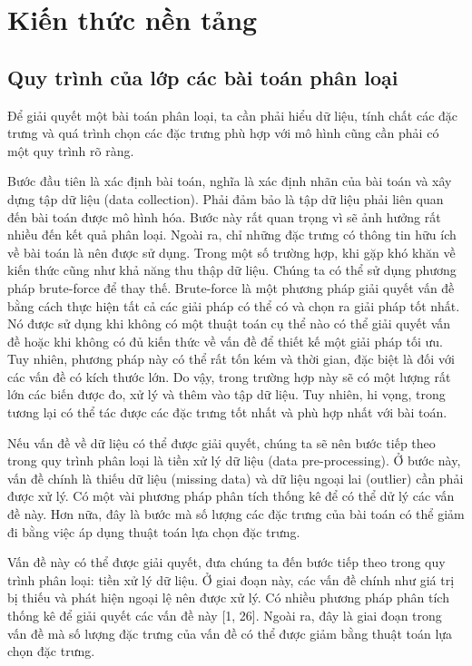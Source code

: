 \chapter{Kiến thức nền tảng}

\section{Quy trình của lớp các bài toán phân loại}
Để giải quyết một bài toán phân loại, ta cần phải hiểu dữ liệu, tính chất các đặc trưng và quá trình chọn các đặc trưng phù hợp với mô hình cũng cần phải có một quy trình rõ ràng.

Bước đầu tiên là xác định bài toán, nghĩa là xác định nhãn của bài toán và xây dựng tập dữ liệu (data collection). Phải đảm bảo là tập dữ liệu phải liên quan đến bài toán được mô hình hóa. Bước này rất quan trọng vì sẽ ảnh hưởng rất nhiều đến kết quả phân loại. Ngoài ra, chỉ những đặc trưng có thông tin hữu ích về bài toán là nên được sử dụng. Trong một số trường hợp, khi gặp khó khăn về kiến thức cũng như khả năng thu thập dữ liệu. Chúng ta có thể sử dụng phương pháp brute-force để thay thế. Brute-force là một phương pháp giải quyết vấn đề bằng cách thực hiện tất cả các giải pháp có thể có và chọn ra giải pháp tốt nhất. Nó được sử dụng khi không có một thuật toán cụ thể nào có thể giải quyết vấn đề hoặc khi không có đủ kiến thức về vấn đề để thiết kế một giải pháp tối ưu. Tuy nhiên, phương pháp này có thể rất tốn kém và thời gian, đặc biệt là đối với các vấn đề có kích thước lớn. Do vậy, trong trường hợp này sẽ có một lượng rất lớn các biến được đo, xử lý và thêm vào tập dữ liệu. Tuy nhiên, hi vọng, trong tương lại có thể tác được các đặc trưng tốt nhất và phù hợp nhất với bài toán.

Nếu vấn đề về dữ liệu có thể được giải quyết, chúng ta sẽ nên bước tiếp theo trong quy trình phân loại là tiền xử lý dữ liệu (data pre-processing). Ở bước này, vấn đề chính là thiếu dữ liệu (missing data) và dữ liệu ngoại lai (outlier) cần phải được xử lý. Có một vài phương pháp phân tích thống kê \cite{aggarwal2001outlier, hodge2004survey} để có thể dử lý các vấn đề này. Hơn nữa, đây là bước mà số lượng các đặc trưng của bài toán có thể giảm đi bằng việc áp dụng thuật toán lựa chọn đặc trưng.

Vấn đề này có thể được giải quyết, đưa chúng ta đến bước tiếp theo trong quy trình phân loại: tiền xử lý dữ liệu. Ở giai đoạn này, các vấn đề chính như giá trị bị thiếu và phát hiện ngoại lệ nên được xử lý. Có nhiều phương pháp phân tích thống kê để giải quyết các vấn đề này [1, 26]. Ngoài ra, đây là giai đoạn trong vấn đề mà số lượng đặc trưng của vấn đề có thể được giảm bằng thuật toán lựa chọn đặc trưng.

